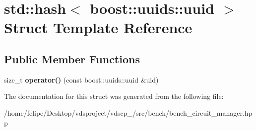 \section{std\+:\+:hash$<$ boost\+:\+:uuids\+:\+:uuid $>$ Struct Template Reference}
\label{structstd_1_1hash_3_01boost_1_1uuids_1_1uuid_01_4}
\subsection*{Public Member Functions}
\begin{DoxyCompactItemize}
\item 
size\+\_\+t {\bfseries operator()} (const boost\+::uuids\+::uuid \&uid)\label{structstd_1_1hash_3_01boost_1_1uuids_1_1uuid_01_4_a6ac7c463e75133c7febbd66f13a9c1dc}

\end{DoxyCompactItemize}


The documentation for this struct was generated from the following file\+:\begin{DoxyCompactItemize}
\item 
/home/felipe/\+Desktop/vdsproject/vdscp\+\_/src/bench/bench\+\_\+circuit\+\_\+manager.\+hpp\end{DoxyCompactItemize}
